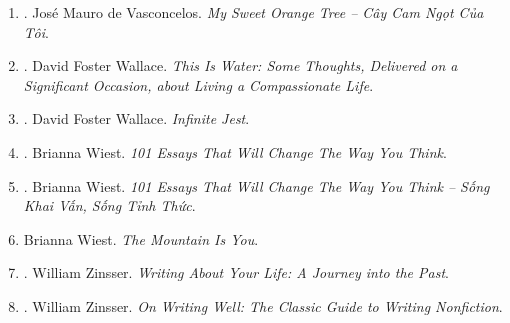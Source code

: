 \documentclass{article}
\begin{document}
\begin{enumerate}
	\item \cite{Vasconcelos_orange_tree}. Jos\'e Mauro de Vasconcelos. {\it My Sweet Orange Tree -- Cây Cam Ngọt Của Tôi}.\hfill{\sf[done]}

	\item \cite{Wallace_water}. David Foster Wallace. {\it This Is Water: Some Thoughts, Delivered on a Significant Occasion, about Living a Compassionate Life}.\hfill{\sf[done]}

	\item \cite{Wallace_jest}. David Foster Wallace. {\it Infinite Jest}.\hfill{\sf[reading]}

	\item \cite{Wiest_101_essays}. {\sc Brianna Wiest}. {\it 101 Essays That Will Change The Way You Think}.

	\item \cite{Wiest_101_essays_VN}. {\sc Brianna Wiest}. {\it 101 Essays That Will Change The Way You Think -- Sống Khai Vấn, Sống Tỉnh Thức}.\hfill{\sf[done]}

    \item {\sc Brianna Wiest}. {\it The Mountain Is You}.\hfill{\sf[done]}

	\item \cite{Zinsser2005}. William Zinsser. {\it Writing About Your Life: A Journey into the Past}.

	\item \cite{Zinsser2016}. William Zinsser. {\it On Writing Well: The Classic Guide to Writing Nonfiction}.\hfill{\sf[reading]}
\end{enumerate}

\end{document}
